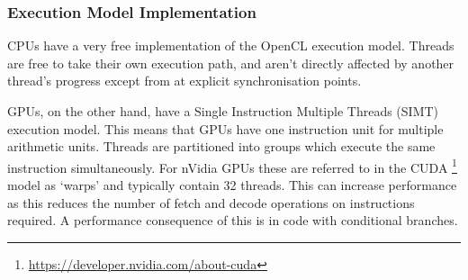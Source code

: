 %
%
%
%

\subsubsection{Execution Model Implementation}

CPUs have a very free implementation of the OpenCL execution model. Threads are
free to take their own execution path, and aren't directly affected by another
thread's progress except from at explicit synchronisation points.

GPUs, on the other hand, have a Single Instruction Multiple Threads (SIMT)
execution model. This means that GPUs have one instruction unit for multiple
arithmetic units. Threads are partitioned into groups which execute the same
instruction simultaneously. For nVidia GPUs these are referred to in the CUDA
\footnote{\url{https://developer.nvidia.com/about-cuda}} model as `warps' and
typically contain 32 threads. This can increase performance as this reduces the
number of fetch and decode operations on instructions required. A performance
consequence of this is in code with conditional branches.

